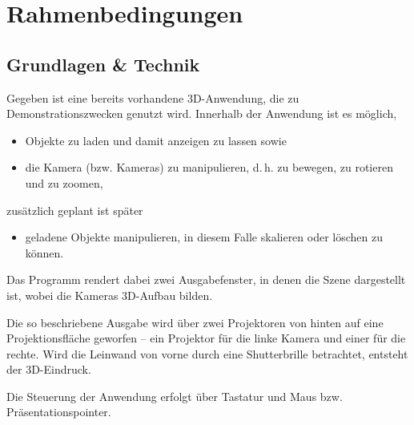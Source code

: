 \documentclass[12pt,a4paper]{article}
\title{\Title}
\author{
	Mario Janke\\
	Peter Lindner\\
	Patrik Stäblein}
\date{}
\begin{document}
\maketitle
\tableofcontents
\clearpage
\section{Rahmenbedingungen}
	\subsection{Grundlagen \& Technik}
	Gegeben ist eine bereits vorhandene 3D-Anwendung, die zu Demonstrationszwecken genutzt wird. Innerhalb der Anwendung ist es möglich,
	\begin{itemize}
		\item Objekte zu laden und damit anzeigen zu lassen sowie
		\item die Kamera (bzw. Kameras) zu manipulieren, d.\,h. zu bewegen, zu rotieren und zu zoomen,
	\end{itemize}
zusätzlich geplant ist später
	\begin{itemize}
		\item geladene Objekte manipulieren, in diesem Falle skalieren oder löschen zu können.
	\end{itemize}
	Das Programm rendert dabei zwei Ausgabefenster, in denen die Szene dargestellt ist, wobei die Kameras 3D-Aufbau bilden.\par
	Die so beschriebene Ausgabe wird über zwei Projektoren von hinten auf eine Projektionsfläche geworfen -- ein Projektor für die linke Kamera und einer für die rechte. Wird die \glqq Leinwand\grqq{} von vorne durch eine Shutterbrille betrachtet, entsteht der 3D-Eindruck.\par 
	Die Steuerung der Anwendung erfolgt über Tastatur und Maus bzw. Präsentationspointer.
\end{document}
